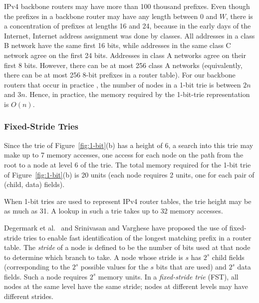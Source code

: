 IPv4 backbone routers may have more than 100 thousand prefixes.
Even though the prefixes in a backbone router may have any length between 0 and
$W$, there is a concentration of prefixes at lengths 16 and 24, because
in the early days of the Internet, Internet address assignment was done by
classes. All addresses in a class B network have the same first 16 bits,
while addresses in the same class C network agree on the first 24 bits.
Addresses in class A networks agree on their first 8 bits. However,
there can be at most 256 class A networks (equivalently, there can be at most
256 8-bit prefixes in a router table).
For our backbone routers that occur in practice \cite{sahni1},
the number of nodes in a 1-bit trie is between $2n$
and $3n$. Hence, in practice, the memory required by the 1-bit-trie
representation is $O(n)$.


\subsubsection{Fixed-Stride Tries}\label{sec:fixed}
Since the trie of Figure~\ref{fig:1-bit}(b) has a height of 6,
a search into
this trie may make up to 7 memory accesses, one access for each node on the path
from the root to a node at level 6 of the trie. The total memory required for
the 1-bit trie of Figure~\ref{fig:1-bit}(b) is 20 units (each node requires
2 units, one for each pair of (child, data) fields).

When 1-bit tries are used to represent IPv4 router tables, the trie height
may be as much as 31. A lookup in such a trie takes up to 32
memory accesses.

Degermark et al.~\cite{deger} and
Srinivasan and Varghese \cite{sri:expansion} have proposed the use of
fixed-stride tries to enable fast identification of the
longest matching prefix in a router table.
The {\em stride} of a node is defined to be the
number of bits used at that node to determine which branch to take.
A node whose stride is $s$ has $2^s$ child fields (corresponding to the
$2^s$ possible values for the $s$ bits that are used) and $2^s$ data fields.
Such a node requires
$2^s$ memory units.
In a {\em fixed-stride trie} (FST), all nodes at the same level have the same stride;
nodes at different levels may have different strides.

